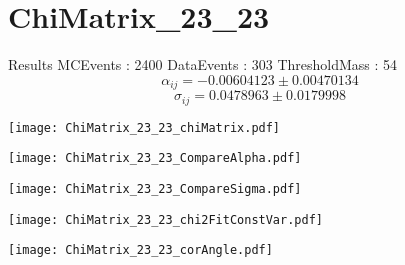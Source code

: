 \documentclass[a4paper,12pt]{article}
\begin{document}
\section{ChiMatrix\_23\_23}
\begin{minipage}{0.49\linewidth} Results \newline
MCEvents : 2400\newline
DataEvents : 303 \newline
ThresholdMass : 54\\
$$\alpha_{ij} = -0.00604123\pm 0.00470134$$
$$\sigma_{ij} = 0.0478963\pm 0.0179998$$
\end{minipage}\hfill
\begin{minipage}{0.49\linewidth} 
\texttt{[image: ChiMatrix\_23\_23\_chiMatrix.pdf]}\\
\end{minipage}
\hfill
\begin{minipage}{0.49\linewidth} 
\texttt{[image: ChiMatrix\_23\_23\_CompareAlpha.pdf]}\\
\end{minipage}
\hfill
\begin{minipage}{0.49\linewidth} 
\texttt{[image: ChiMatrix\_23\_23\_CompareSigma.pdf]}\\
\end{minipage}
\begin{minipage}{0.49\linewidth} 
\texttt{[image: ChiMatrix\_23\_23\_chi2FitConstVar.pdf]}\\
\end{minipage}
\hfill
\begin{minipage}{0.49\linewidth} 
\texttt{[image: ChiMatrix\_23\_23\_corAngle.pdf]}\\
\end{minipage}
\end{document}
